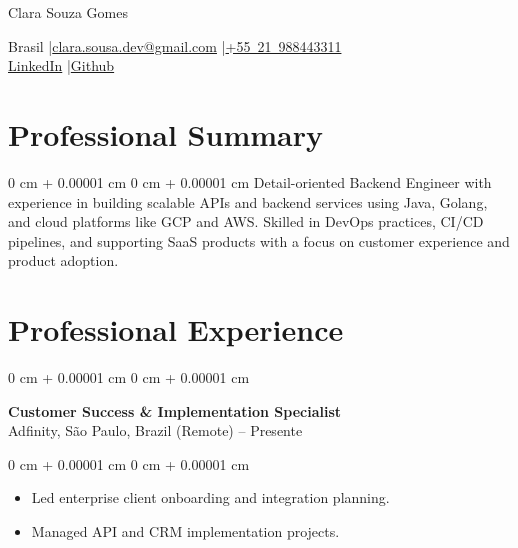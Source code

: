 \documentclass[10pt, letterpaper]{article}
\newenvironment{highlights}{
    \begin{itemize}[
        topsep=0.10 cm,
        parsep=0.10 cm,
        partopsep=0pt,
        itemsep=0pt,
        leftmargin=0 cm + 10pt
    ]
}{
    \end{itemize}
}
\newenvironment{onecolentry}{
    \begin{adjustwidth}{
        0 cm + 0.00001 cm
    }{
        0 cm + 0.00001 cm
    }
}{
    \end{adjustwidth}
}
\newenvironment{header}{
    \setlength{\topsep}{0pt}\par\kern\topsep\centering\linespread{1.5}
}{
    \par\kern\topsep
}
\begin{document}
\begin{header}
    {\fontsize{25pt}{25pt}\selectfont Clara Souza Gomes}

    \vspace{0pt}

    \normalsize
    \mbox{Brasil} \enskip|\enskip \mbox{\href{mailto:clara.sousa.dev@gmail.com}{clara.sousa.dev@gmail.com}} \enskip|\enskip \mbox{\href{tel:+5521988443311}{+55 21 988443311}} \\
    \mbox{\href{https://www.linkedin.com/in/clarasousa/}{LinkedIn}} \enskip|\enskip \mbox{\href{https://github.com/clarasg}{Github}}
\end{header}

\vspace{5pt - 0.1cm}

\section{Professional Summary}
\begin{onecolentry}{Detail-oriented Backend Engineer with experience in building scalable APIs and backend services using Java, Golang, and cloud platforms like GCP and AWS. Skilled in DevOps practices, CI/CD pipelines, and supporting SaaS products with a focus on customer experience and product adoption.}\end{onecolentry}
\section{Professional Experience}

\begin{onecolentry}
    \setcolumnwidth{\fill, 4.5cm}
    \begin{paracol}{2}
        \textbf{Customer Success \& Implementation Specialist} \\ Adfinity, São Paulo, Brazil (Remote)
        \switchcolumn
         – Presente
    \end{paracol}
\end{onecolentry}
\vspace{0.10cm}
\begin{onecolentry}
    \begin{highlights}
                \item Led enterprise client onboarding and integration planning.
                \item Managed API and CRM implementation projects.
    \end{highlights}
\end{onecolentry}
\end{document}
